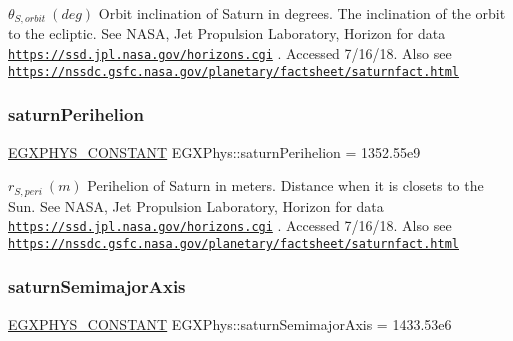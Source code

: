 $ \theta_{S,orbit} \ (deg)$ Orbit inclination of Saturn in degrees. The inclination of the orbit to the ecliptic. See N\+A\+SA, Jet Propulsion Laboratory, Horizon for data \href{https://ssd.jpl.nasa.gov/horizons.cgi}{\tt https\+://ssd.\+jpl.\+nasa.\+gov/horizons.\+cgi} . Accessed 7/16/18. Also see \href{https://nssdc.gsfc.nasa.gov/planetary/factsheet/saturnfact.html}{\tt https\+://nssdc.\+gsfc.\+nasa.\+gov/planetary/factsheet/saturnfact.\+html} \mbox{\label{group___e_g_x_phys-_constants-_astrophysics-_solar_system-_saturn-_orbit_ga885e13428fef6b0601c47e34fb60d1c3}} 
\subsubsection{\texorpdfstring{saturn\+Perihelion}{saturnPerihelion}}
{\footnotesize\ttfamily \mbox{\hyperlink{group___e_g_x_phys-_constants-_macros_ga76980d288494ce1714c9ac68a95ba702}{E\+G\+X\+P\+H\+Y\+S\+\_\+\+C\+O\+N\+S\+T\+A\+NT}} E\+G\+X\+Phys\+::saturn\+Perihelion = 1352.\+55e9}

$ r_{S,peri} \ (m)$ Perihelion of Saturn in meters. Distance when it is closets to the Sun. See N\+A\+SA, Jet Propulsion Laboratory, Horizon for data \href{https://ssd.jpl.nasa.gov/horizons.cgi}{\tt https\+://ssd.\+jpl.\+nasa.\+gov/horizons.\+cgi} . Accessed 7/16/18. Also see \href{https://nssdc.gsfc.nasa.gov/planetary/factsheet/saturnfact.html}{\tt https\+://nssdc.\+gsfc.\+nasa.\+gov/planetary/factsheet/saturnfact.\+html} \mbox{\label{group___e_g_x_phys-_constants-_astrophysics-_solar_system-_saturn-_orbit_ga65da0ac69d15eea1dfcec3e36bebbafd}} 
\subsubsection{\texorpdfstring{saturn\+Semimajor\+Axis}{saturnSemimajorAxis}}
{\footnotesize\ttfamily \mbox{\hyperlink{group___e_g_x_phys-_constants-_macros_ga76980d288494ce1714c9ac68a95ba702}{E\+G\+X\+P\+H\+Y\+S\+\_\+\+C\+O\+N\+S\+T\+A\+NT}} E\+G\+X\+Phys\+::saturn\+Semimajor\+Axis = 1433.\+53e6}

